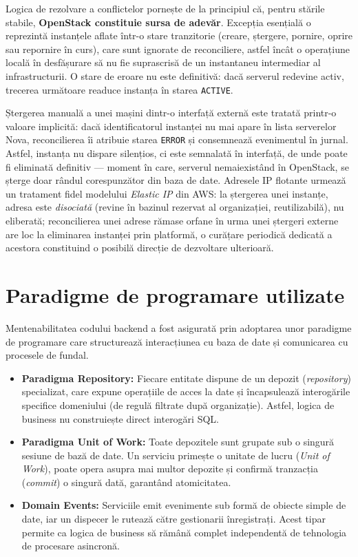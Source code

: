 Logica de rezolvare a conflictelor pornește de la principiul că, pentru stările stabile, \textbf{OpenStack constituie sursa de adevăr}. Excepția esențială o reprezintă instanțele aflate într-o stare tranzitorie (creare, ștergere, pornire, oprire sau repornire în curs), care sunt ignorate de reconciliere, astfel încât o operațiune locală în desfășurare să nu fie suprascrisă de un instantaneu intermediar al infrastructurii. O stare de eroare nu este definitivă: dacă serverul redevine activ, trecerea următoare readuce instanța în starea \texttt{ACTIVE}.

Ștergerea manuală a unei mașini dintr-o interfață externă este tratată printr-o valoare implicită: dacă identificatorul instanței nu mai apare în lista serverelor Nova, reconcilierea îi atribuie starea \texttt{ERROR} și consemnează evenimentul în jurnal. Astfel, instanța nu dispare silențios, ci este semnalată în interfață, de unde poate fi eliminată definitiv --- moment în care, serverul nemaiexistând în OpenStack, se șterge doar rândul corespunzător din baza de date. Adresele IP flotante urmează un tratament fidel modelului \textit{Elastic IP} din AWS: la ștergerea unei instanțe, adresa este \textit{disociată} (revine în bazinul rezervat al organizației, reutilizabilă), nu eliberată; reconcilierea unei adrese rămase orfane în urma unei ștergeri externe are loc la eliminarea instanței prin platformă, o curățare periodică dedicată a acestora constituind o posibilă direcție de dezvoltare ulterioară.

\section{Paradigme de programare utilizate}
\label{sec:cap3_tipare}

Mentenabilitatea codului backend a fost asigurată prin adoptarea unor paradigme de programare care structurează interacțiunea cu baza de date și comunicarea cu procesele de fundal.

\begin{itemize}
    \item \textbf{Paradigma Repository:} Fiecare entitate dispune de un depozit (\textit{repository}) specializat, care expune operațiile de acces la date și încapsulează interogările specifice domeniului (de regulă filtrate după organizație). Astfel, logica de business nu construiește direct interogări SQL.
    \item \textbf{Paradigma Unit of Work:} Toate depozitele sunt grupate sub o singură sesiune de bază de date. Un serviciu primește o unitate de lucru (\textit{Unit of Work}), poate opera asupra mai multor depozite și confirmă tranzacția (\textit{commit}) o singură dată, garantând atomicitatea.
    \item \textbf{Domain Events:} Serviciile emit evenimente sub formă de obiecte simple de date, iar un dispecer le rutează către gestionarii înregistrați. Acest tipar permite ca logica de business să rămână complet independentă de tehnologia de procesare asincronă.
\end{itemize}

